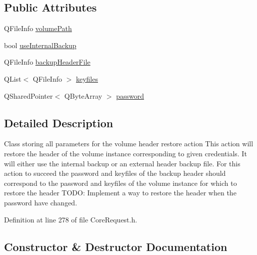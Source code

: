 \subsection*{Public Attributes}
\begin{DoxyCompactItemize}
\item 
Q\+File\+Info \hyperlink{struct_gost_crypt_1_1_core_1_1_restore_header_request_ad80334ccac055814a5d53569e21b9bc3}{volume\+Path}
\item 
bool \hyperlink{struct_gost_crypt_1_1_core_1_1_restore_header_request_a292294e077bb9c0b213941345d64c18c}{use\+Internal\+Backup}
\item 
Q\+File\+Info \hyperlink{struct_gost_crypt_1_1_core_1_1_restore_header_request_a92f7e41a7b7ecee63bc4909248d89b5a}{backup\+Header\+File}
\item 
Q\+List$<$ Q\+File\+Info $>$ \hyperlink{struct_gost_crypt_1_1_core_1_1_restore_header_request_ad2f1078db3b7f0c195a839a082818bd6}{keyfiles}
\item 
Q\+Shared\+Pointer$<$ Q\+Byte\+Array $>$ \hyperlink{struct_gost_crypt_1_1_core_1_1_restore_header_request_ac65b8435be718da772543eb3b675eb3d}{password}
\end{DoxyCompactItemize}


\subsection{Detailed Description}
Class storing all parameters for the volume header restore action This action will restore the header of the volume instance corresponding to given credentials. It will either use the internal backup or an external header backup file. For this action to succeed the password and keyfiles of the backup header should correspond to the password and keyfiles of the volume instance for which to restore the header T\+O\+DO\+: Implement a way to restore the header when the password have changed. 

Definition at line 278 of file Core\+Request.\+h.



\subsection{Constructor \& Destructor Documentation}
\mbox{\label{struct_gost_crypt_1_1_core_1_1_restore_header_request_a1a8eac2c7a809e7bfeea266823861c32}} 
